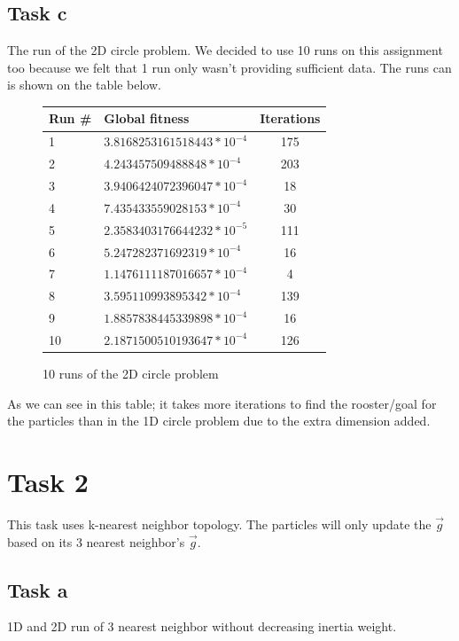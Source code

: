 \documentclass[12pt, a4paper]{article}
\begin{document}
\subsection{Task c}
The run of the 2D circle problem. We decided to use 10 runs on this assignment too because we felt that 1 run only wasn't providing sufficient data. The runs can is shown on the table below.
\begin{figure}[H]
\begin{center}
\begin{tabular}{l| l  c}
Run \# & Global fitness& Iterations\\ \hline
1&$3.8168253161518443*10^{-4}$ & 175\\ 
2&$4.243457509488848*10^{-4}$ & 203\\
3&$3.9406424072396047*10^{-4}$ & 18\\ 
4&$7.435433559028153*10^{-4}$ & 30\\
5&$2.3583403176644232*10^{-5}$ & 111\\ 
6&$5.247282371692319*10^{-4}$ & 16\\ 
7&$1.1476111187016657*10^{-4}$ & 4\\ 
8&$3.595110993895342*10^{-4}$ & 139\\
9&$1.8857838445339898*10^{-4}$ & 16\\ 
10&$2.1871500510193647*10^{-4}$ & 126\\ 
\end{tabular}
\caption{10 runs of the 2D circle problem}
\end{center}
\end{figure}
As we can see in this table; it takes more iterations to find the rooster/goal for the particles than in the 1D circle problem due to the extra dimension added.

\section{Task 2}
This task uses k-nearest neighbor topology. The particles will only update the $\vec{g}$ based on its 3 nearest neighbor's $\vec{g}$. 
\subsection{Task a}
1D and 2D run of 3 nearest neighbor without decreasing inertia weight.
\end{document}
